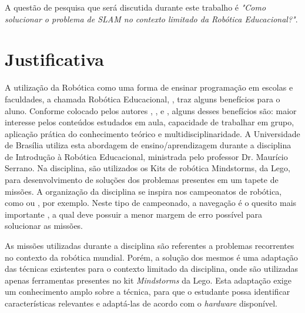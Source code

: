 	A questão de pesquisa que será discutida durante este trabalho é \textit{"Como solucionar o problema de SLAM no contexto limitado da Robótica Educacional?"}.

\section{Justificativa}

	A utilização da Robótica como uma forma de ensinar programação em escolas e faculdades, a chamada Robótica Educacional, \cite{roboticaEducacionalAulasMatematica}, traz alguns benefícios para o aluno. Conforme colocado pelos autores \cite{teachingWithRoboticKit}, \cite{roboticEducationBasedLego}, \cite{roboticaEducacionalAulasMatematica} e \cite{evaluationRoboticEducationScale}, alguns desses benefícios são: maior interesse pelos conteúdos estudados em aula, capacidade de trabalhar em grupo, aplicação prática do conhecimento teórico e multidisciplinaridade. A Universidade de Brasília utiliza esta abordagem de ensino/aprendizagem durante a disciplina de Introdução à Robótica Educacional, ministrada pelo professor Dr. Maurício Serrano. Na disciplina, são utilizados os Kits de robótica Mindstorms, da Lego, para desenvolvimento de soluções dos problemas presentes em um tapete de missões. A organização da disciplina se inspira nos campeonatos de robótica, como \cite{ciber-rato} ou \cite{roboBulldozerIV}, por exemplo. Neste tipo de campeonado, a navegação é o quesito mais importante \cite{ciber-rato}, a qual deve possuir a menor margem de erro possível para solucionar as missões.

	As missões utilizadas durante a disciplina são referentes a problemas recorrentes no contexto da robótica mundial. Porém, a solução dos mesmos é uma adaptação das técnicas existentes para o contexto limitado da disciplina, onde são utilizadas apenas ferramentas presentes no kit \textit{Mindstorms} da Lego. Esta adaptação exige um conhecimento amplo sobre a técnica, para que o estudante possa identificar características relevantes e adaptá-las de acordo com o \textit{hardware} disponível.


